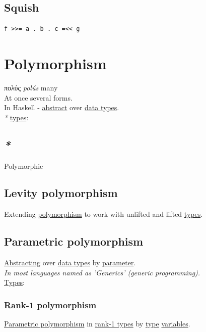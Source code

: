 \documentclass[a4paper,14pt,oneside]{book}
\begin{document}
\section{\label{orgcee6778}Squish}
\label{sec:orgf22207c}
\begin{verbatim}
f >>= a . b . c =<< g
\end{verbatim}

\chapter{\label{org631694f}Polymorphism}
\label{sec:orga1a27c7}
πολύς \emph{polús} many\\

At once several forms.\\

In Haskell - \hyperref[orgb942bc6]{abstract} over \hyperref[orgf2a6cad]{data types}.\\

\emph{*} \hyperref[org430d788]{types}:\\

\section{\emph{*}}
\label{sec:org5aa7ae6}

\label{orgd6e543b}Polymorphic\\

\section{\label{orgea7156f}Levity polymorphism}
\label{sec:org5ce422a}
Extending \hyperref[org631694f]{polymorphism} to work with unlifted and lifted \hyperref[org430d788]{types}.\\

\section{\label{org7148738}Parametric polymorphism}
\label{sec:orga765993}
\hyperref[org1ecb798]{Abstracting} over \hyperref[orgf2a6cad]{data types} by \hyperref[orga2e5d96]{parameter}.\\

\emph{In most languages named as 'Generics' (generic programming).}\\

\hyperref[org430d788]{Types}:\\

\subsection{\label{org4818e17}Rank-1 polymorphism}
\label{sec:org55a28dc}
\hyperref[org7148738]{Parametric polymorphism} in \hyperref[org253a11e]{rank-1 types} by \hyperref[orgdbcea73]{type} \hyperref[org1f76999]{variables}.\\
\end{document}
